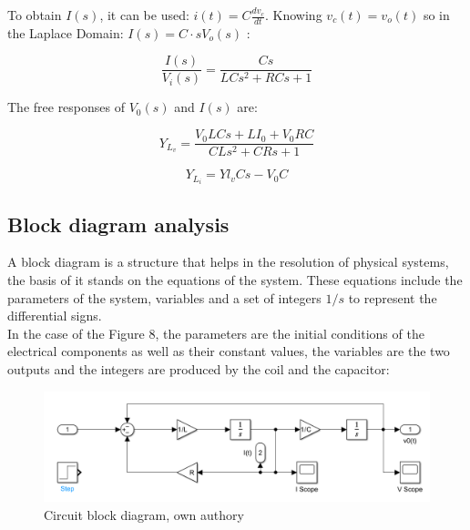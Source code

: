 \documentclass[a4paper,12pt]{article}
\begin{document}
To obtain $I(s)$, it can be used: $i(t)=C\frac{dv_c}{dt}$. Knowing $v_c(t)=v_o(t)$ so in the Laplace Domain: $I(s)=C \cdot sV_o(s)$ : 

\vspace{0.5cm}

\begin{equation}
\frac{I(s)}{V_i(s)}=\frac{Cs}{LCs^2+RCs+1 }
\end{equation}

\vspace{1cm}

The free responses of $V_0(s)$ and $I(s)$ are:

\vspace{0.5cm}

\begin{equation}
    Y_{L_v} = \frac{V_0LCs + LI_0 + V_0RC}{CLs^2 + CRs + 1}
\end{equation}

\vspace{0.5cm}

\begin{equation}
    Y_{L_i} = Yl_vCs - V_0C
\end{equation}

\vspace{0.5cm}

\subsection{Block diagram analysis}

\vspace{0.5cm}

A block diagram is a structure that helps in the resolution of physical systems, the basis of it stands on the equations of the system. These equations include the parameters of the system, variables and a set of integers $1/s$ to represent the differential signs.\\ In the case of the Figure 8, the parameters are the initial conditions of the electrical components as well as their constant values, the variables are the two outputs and the integers are produced by the coil and the capacitor:

\vspace{0.5cm}

\begin{figure}[H]
    \centering
    \includegraphics[width=0.75\linewidth]{fonts_lab_2/block_diagram.png}
    \caption{Circuit block diagram, own authory}
    \label{fig:Lab 2 circuit}
\end{figure}
\end{document}
